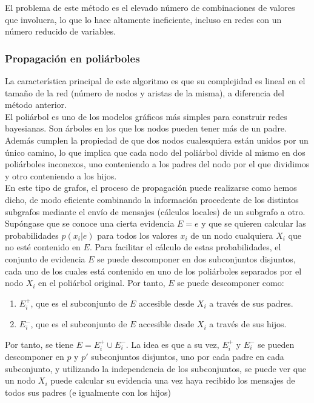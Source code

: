 \documentclass{article}
\theoremstyle{definition_wo_parentheses}
\begin{document}
El problema de este método es el elevado número de combinaciones de valores que involucra, lo que lo hace altamente ineficiente, incluso en redes con un número reducido de variables.

\subsubsection{Propagación en poliárboles}
La característica principal de este algoritmo es que su complejidad es lineal en el tamaño de la red (número de nodos y aristas de la misma), a diferencia del método anterior.\\
El poliárbol es uno de los modelos gráficos más simples para construir redes bayesianas. Son árboles en los que los nodos pueden tener más de un padre. Además cumplen la propiedad de que dos nodos cualesquiera están unidos por un único camino, lo que implica que cada nodo del poliárbol divide al mismo en dos poliárboles inconexos, uno conteniendo a los padres del nodo por el que dividimos y otro conteniendo a los hijos.\\
En este tipo de grafos, el proceso de propagación puede realizarse como hemos dicho, de modo eficiente combinando la información procedente de los distintos subgrafos mediante el envío de mensajes (cálculos locales) de un subgrafo a otro. Supóngase que se conoce una cierta evidencia $E=e$ y que se quieren calcular las probabilidades $p(x_i|e)$ para todos los valores $x_i$ de un nodo cualquiera $X_i$ que no esté contenido en $E$. Para facilitar el cálculo de estas probabilidades, el conjunto de evidencia $E$ se puede descomponer en dos subconjuntos disjuntos, cada uno de los cuales está contenido en uno de los poliárboles separados por el nodo $X_i$ en el poliárbol original. Por tanto, $E$ se puede descomponer como:
\begin{enumerate}
\item $E_i^+$, que es el subconjunto de $E$ accesible desde $X_i$ a través de sus padres.
\item $E_i^-$, que es el subconjunto de $E$ accesible desde $X_i$ a través de sus hijos.
\end{enumerate}
Por tanto, se tiene $E=E_i^+ \cup E_i^-$. La idea es que a su vez, $E_i^+$ y $E_i^-$ se pueden descomponer en $p$ y $p'$ subconjuntos disjuntos, uno por cada padre en cada subconjunto, y utilizando la independencia de los subconjuntos, se puede ver que un nodo $X_i$ puede calcular su evidencia una vez haya recibido los mensajes de todos sus padres (e igualmente con los hijos)
\end{document}

